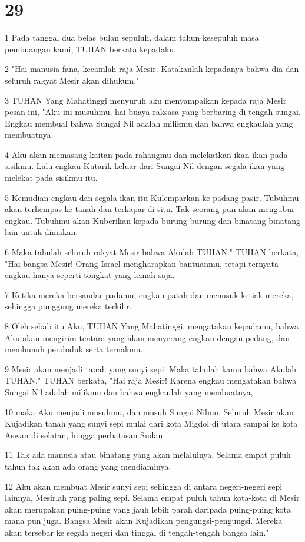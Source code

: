\chapter{29}

\par 1 Pada tanggal dua belas bulan sepuluh, dalam tahun kesepuluh masa pembuangan kami, TUHAN berkata kepadaku,
\par 2 "Hai manusia fana, kecamlah raja Mesir. Katakanlah kepadanya bahwa dia dan seluruh rakyat Mesir akan dihukum."
\par 3 TUHAN Yang Mahatinggi menyuruh aku menyampaikan kepada raja Mesir pesan ini, "Aku ini musuhmu, hai buaya raksasa yang berbaring di tengah sungai. Engkau membual bahwa Sungai Nil adalah milikmu dan bahwa engkaulah yang membuatnya.
\par 4 Aku akan memasang kaitan pada rahangmu dan melekatkan ikan-ikan pada sisikmu. Lalu engkau Kutarik keluar dari Sungai Nil dengan segala ikan yang melekat pada sisikmu itu.
\par 5 Kemudian engkau dan segala ikan itu Kulemparkan ke padang pasir. Tubuhmu akan terhempas ke tanah dan terkapar di situ. Tak seorang pun akan mengubur engkau. Tubuhmu akan Kuberikan kepada burung-burung dan binatang-binatang lain untuk dimakan.
\par 6 Maka tahulah seluruh rakyat Mesir bahwa Akulah TUHAN." TUHAN berkata, "Hai bangsa Mesir! Orang Israel mengharapkan bantuanmu, tetapi ternyata engkau hanya seperti tongkat yang lemah saja.
\par 7 Ketika mereka bersandar padamu, engkau patah dan menusuk ketiak mereka, sehingga punggung mereka terkilir.
\par 8 Oleh sebab itu Aku, TUHAN Yang Mahatinggi, mengatakan kepadamu, bahwa Aku akan mengirim tentara yang akan menyerang engkau dengan pedang, dan membunuh penduduk serta ternakmu.
\par 9 Mesir akan menjadi tanah yang sunyi sepi. Maka tahulah kamu bahwa Akulah TUHAN." TUHAN berkata, "Hai raja Mesir! Karena engkau mengatakan bahwa Sungai Nil adalah milikmu dan bahwa engkaulah yang membuatnya,
\par 10 maka Aku menjadi musuhmu, dan musuh Sungai Nilmu. Seluruh Mesir akan Kujadikan tanah yang sunyi sepi mulai dari kota Migdol di utara sampai ke kota Aswan di selatan, hingga perbatasan Sudan.
\par 11 Tak ada manusia atau binatang yang akan melaluinya. Selama empat puluh tahun tak akan ada orang yang mendiaminya.
\par 12 Aku akan membuat Mesir sunyi sepi sehingga di antara negeri-negeri sepi lainnya, Mesirlah yang paling sepi. Selama empat puluh tahun kota-kota di Mesir akan merupakan puing-puing yang jauh lebih parah daripada puing-puing kota mana pun juga. Bangsa Mesir akan Kujadikan pengungsi-pengungsi. Mereka akan tersebar ke segala negeri dan tinggal di tengah-tengah bangsa lain."
